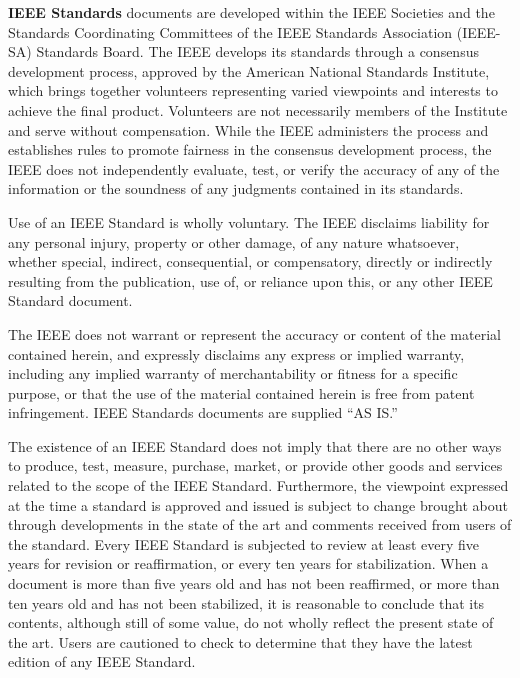 \thispagestyle{empty}
{\fontsize{8.7}{11.2}\selectfont
\textbf{IEEE Standards} documents are developed within the IEEE Societies and the Standards Coordinating Committees of the IEEE Standards Association (IEEE-SA) Standards Board. The IEEE develops its standards through a consensus development process, approved by the American National Standards Institute, which brings together volunteers representing varied viewpoints and interests to achieve the final product. Volunteers are not necessarily members of the Institute and serve without compensation. While the IEEE administers the process and establishes rules to promote fairness in the consensus development process, the IEEE does not independently evaluate, test, or verify the accuracy of any of the information or the soundness of any judgments contained in its standards.\par
\vspace{11.5pt}
Use of an IEEE Standard is wholly voluntary. The IEEE disclaims liability for any personal injury, property or other damage, of any nature whatsoever, whether special, indirect, consequential, or compensatory, directly or indirectly resulting from the publication, use of, or reliance upon this, or any other IEEE Standard document.\par
\vspace{11.5pt}
The IEEE does not warrant or represent the accuracy or content of the material contained herein, and expressly disclaims any express or implied warranty, including any implied warranty of merchantability or fitness for a specific purpose, or that the use of the material contained herein is free from patent infringement. IEEE Standards documents are supplied ``AS IS.''\par
\vspace{11.5pt}
The existence of an IEEE Standard does not imply that there are no other ways to produce, test, measure, purchase, market, or provide other goods and services related to the scope of the IEEE Standard. Furthermore, the viewpoint expressed at the time a standard is approved and issued is subject to change brought about through developments in the state of the art and comments received from users of the standard. Every IEEE Standard is subjected to review at least every five years for revision or reaffirmation, or every ten years for stabilization. When a document is more than five years old and has not been reaffirmed, or more than ten years old and has not been stabilized, it is reasonable to conclude that its contents, although still of some value, do not wholly reflect the present state of the art. Users are cautioned to check to determine that they have the latest edition of any IEEE Standard.\par
}
